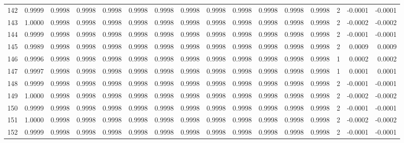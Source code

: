 \begin{tabular}{lrrrrrrrrrrrrrrr}
142 &      0.9999 &  0.9998 &  0.9998 &  0.9998 &  0.9998 &  0.9998 &  0.9998 &  0.9998 &  0.9998 &  0.9998 &   0.9998 &     0.9998 &      2 &                   -0.0001 &                    -0.0001 \\
143 &      1.0000 &  0.9998 &  0.9998 &  0.9998 &  0.9998 &  0.9998 &  0.9998 &  0.9998 &  0.9998 &  0.9998 &   0.9998 &     0.9998 &      2 &                   -0.0002 &                    -0.0002 \\
144 &      0.9999 &  0.9998 &  0.9998 &  0.9998 &  0.9998 &  0.9998 &  0.9998 &  0.9998 &  0.9998 &  0.9998 &   0.9998 &     0.9998 &      2 &                   -0.0001 &                    -0.0001 \\
145 &      0.9989 &  0.9998 &  0.9998 &  0.9998 &  0.9998 &  0.9998 &  0.9998 &  0.9998 &  0.9998 &  0.9998 &   0.9998 &     0.9998 &      2 &                    0.0009 &                     0.0009 \\
146 &      0.9996 &  0.9998 &  0.9998 &  0.9998 &  0.9998 &  0.9998 &  0.9998 &  0.9998 &  0.9998 &  0.9998 &   0.9998 &     0.9998 &      1 &                    0.0002 &                     0.0002 \\
147 &      0.9997 &  0.9998 &  0.9998 &  0.9998 &  0.9998 &  0.9998 &  0.9998 &  0.9998 &  0.9998 &  0.9998 &   0.9998 &     0.9998 &      1 &                    0.0001 &                     0.0001 \\
148 &      0.9999 &  0.9998 &  0.9998 &  0.9998 &  0.9998 &  0.9998 &  0.9998 &  0.9998 &  0.9998 &  0.9998 &   0.9998 &     0.9998 &      2 &                   -0.0001 &                    -0.0001 \\
149 &      1.0000 &  0.9998 &  0.9998 &  0.9998 &  0.9998 &  0.9998 &  0.9998 &  0.9998 &  0.9998 &  0.9998 &   0.9998 &     0.9998 &      2 &                   -0.0002 &                    -0.0002 \\
150 &      0.9999 &  0.9998 &  0.9998 &  0.9998 &  0.9998 &  0.9998 &  0.9998 &  0.9998 &  0.9998 &  0.9998 &   0.9998 &     0.9998 &      2 &                   -0.0001 &                    -0.0001 \\
151 &      1.0000 &  0.9998 &  0.9998 &  0.9998 &  0.9998 &  0.9998 &  0.9998 &  0.9998 &  0.9998 &  0.9998 &   0.9998 &     0.9998 &      2 &                   -0.0002 &                    -0.0002 \\
152 &      0.9999 &  0.9998 &  0.9998 &  0.9998 &  0.9998 &  0.9998 &  0.9998 &  0.9998 &  0.9998 &  0.9998 &   0.9998 &     0.9998 &      2 &                   -0.0001 &                    -0.0001 \\

\end{tabular}
